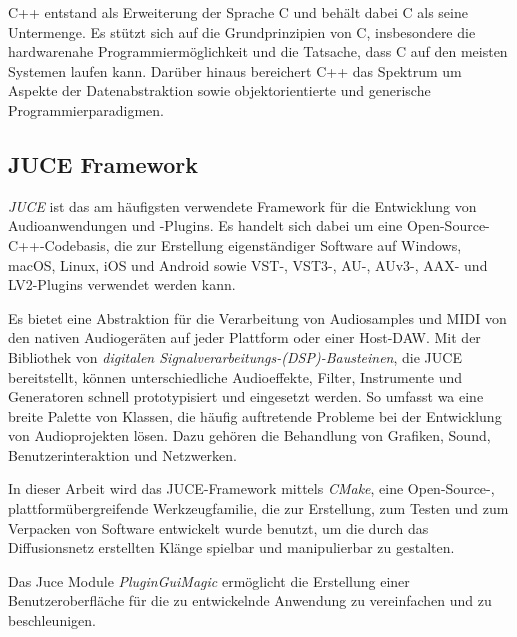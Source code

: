 \documentclass[
  a4paper,  %
  twoside,  %
  bibliography=totoc,
  headsepline,
  cleardoublepage=empty,
  parskip=half,
  draft=false
]{scrbook}
\begin{document}
C++ entstand als Erweiterung der Sprache C und behält dabei C als seine Untermenge. Es stützt sich auf die Grundprinzipien von C, insbesondere die hardwarenahe Programmiermöglichkeit und die Tatsache, dass C auf den meisten Systemen laufen kann. Darüber hinaus bereichert C++ das Spektrum um Aspekte der Datenabstraktion sowie objektorientierte und generische Programmierparadigmen. \cite{stroustrup_c_1997}
\subsection{JUCE Framework}
\glqq\emph{JUCE} ist das am häufigsten verwendete Framework für die Entwicklung von Audioanwendungen und -Plugins. Es handelt sich dabei um eine Open-Source-C++-Codebasis, die zur Erstellung eigenständiger Software auf Windows, macOS, Linux, iOS und Android sowie VST-, VST3-, AU-, AUv3-, AAX- und LV2-Plugins verwendet werden kann.\grqq \cite{noauthor_juce_nodate-1}

Es bietet eine Abstraktion für die Verarbeitung von Audiosamples und MIDI von den nativen Audiogeräten auf jeder Plattform oder einer Host-DAW. Mit der Bibliothek von \emph{digitalen Signalverarbeitungs-(DSP)-Bausteinen}, die JUCE bereitstellt, können unterschiedliche Audioeffekte, Filter, Instrumente und Generatoren schnell prototypisiert und eingesetzt werden. \cite{noauthor_juce_nodate-1} So umfasst wa eine breite Palette von Klassen, die häufig auftretende Probleme bei der Entwicklung von Audioprojekten lösen. Dazu gehören die Behandlung von Grafiken, Sound, Benutzerinteraktion und Netzwerken. \cite{robinson_getting_2013}

In dieser Arbeit wird das JUCE-Framework mittels \emph{CMake}, \glqq eine Open-Source-, plattformübergreifende Werkzeugfamilie, die zur Erstellung, zum Testen und zum Verpacken von Software entwickelt wurde\grqq \cite{noauthor_cmake_nodate} benutzt, um die durch das Diffusionsnetz erstellten Klänge spielbar und manipulierbar zu gestalten. 

Das Juce Module \emph{PluginGuiMagic} \cite{walz_plugin_nodate} ermöglicht die Erstellung einer Benutzeroberfläche für die zu entwickelnde Anwendung zu vereinfachen und zu beschleunigen. 
\end{document}
